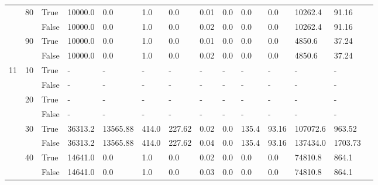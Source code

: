\begin{appendices}
\begin{landscape}
\begin{small}
\begin{longtable}[c]{@{}lll|ll|ll|ll|ll|lll@{}}
   & 80 & True  & 10000.0         & 0.0            & 1.0           & 0.0           & 0.01          & 0.0           & 0.0           & 0.0           & 10262.4       & 91.16       &  \\
   &    & False & 10000.0         & 0.0            & 1.0           & 0.0           & 0.02          & 0.0           & 0.0           & 0.0           & 10262.4       & 91.16       &  \\
   & 90 & True  & 10000.0         & 0.0            & 1.0           & 0.0           & 0.01          & 0.0           & 0.0           & 0.0           & 4850.6        & 37.24       &  \\
   &    & False & 10000.0         & 0.0            & 1.0           & 0.0           & 0.02          & 0.0           & 0.0           & 0.0           & 4850.6        & 37.24       &  \\
  \midrule
11 & 10 & True  & -               & -              & -             & -             & -             & -             & -             & -             & -             & -           &  \\
   &    & False & -               & -              & -             & -             & -             & -             & -             & -             & -             & -           &  \\
   & 20 & True  & -               & -              & -             & -             & -             & -             & -             & -             & -             & -           &  \\
   &    & False & -               & -              & -             & -             & -             & -             & -             & -             & -             & -           &  \\
   & 30 & True  & 36313.2         & 13565.88       & 414.0         & 227.62        & 0.02          & 0.0           & 135.4         & 93.16         & 107072.6      & 963.52      &  \\
   &    & False & 36313.2         & 13565.88       & 414.0         & 227.62        & 0.04          & 0.0           & 135.4         & 93.16         & 137434.0      & 1703.73     &  \\
   & 40 & True  & 14641.0         & 0.0            & 1.0           & 0.0           & 0.02          & 0.0           & 0.0           & 0.0           & 74810.8       & 864.1       &  \\
   &    & False & 14641.0         & 0.0            & 1.0           & 0.0           & 0.03          & 0.0           & 0.0           & 0.0           & 74810.8       & 864.1       &  \\

\end{longtable}
\end{small}
\end{landscape}
\end{appendices}
